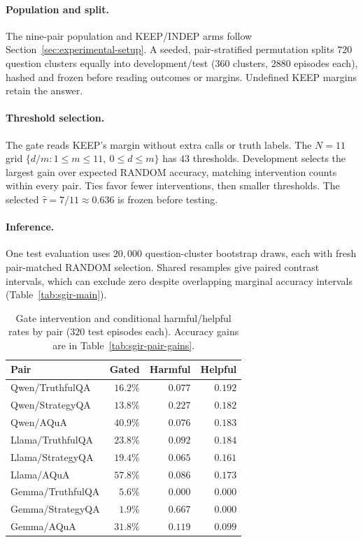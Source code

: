 \documentclass[11pt,a4paper]{article}
\theoremstyle{definition}
\begin{document}
\paragraph{Population and split.}
The nine-pair population and KEEP/INDEP arms follow Section~\ref{sec:experimental-setup}. A seeded, pair-stratified permutation splits $720$ question clusters equally into development/test ($360$ clusters, $2880$ episodes each), hashed and frozen before reading outcomes or margins. Undefined KEEP margins retain the answer.

\paragraph{Threshold selection.}
The gate reads KEEP's margin without extra calls or truth labels. The $N=11$ grid $\{d/m:1\le m\le11,\ 0\le d\le m\}$ has $43$ thresholds. Development selects the largest gain over expected RANDOM accuracy, matching intervention counts within every pair. Ties favor fewer interventions, then smaller thresholds. The selected $\hat\tau=7/11\approx0.636$ is frozen before testing.

\paragraph{Inference.}
One test evaluation uses $20{,}000$ question-cluster bootstrap draws, each with fresh pair-matched RANDOM selection. Shared resamples give paired contrast intervals, which can exclude zero despite overlapping marginal accuracy intervals (Table~\ref{tab:sgir-main}).

\begin{table}[H]
\centering\footnotesize
\setlength{\tabcolsep}{3pt}
\renewcommand{\arraystretch}{1.04}
\caption{Gate intervention and conditional harmful/helpful rates by pair ($320$ test episodes each). Accuracy gains are in Table~\ref{tab:sgir-pair-gains}.}
\label{tab:sgir-breakdown}
\begin{tabularx}{\columnwidth}{@{}Zrrr@{}}
\toprule
Pair & Gated & Harmful & Helpful\\
\midrule
Qwen/TruthfulQA & $16.2\%$ & $0.077$ & $0.192$\\
Qwen/StrategyQA & $13.8\%$ & $0.227$ & $0.182$\\
Qwen/AQuA & $40.9\%$ & $0.076$ & $0.183$\\
Llama/TruthfulQA & $23.8\%$ & $0.092$ & $0.184$\\
Llama/StrategyQA & $19.4\%$ & $0.065$ & $0.161$\\
Llama/AQuA & $57.8\%$ & $0.086$ & $0.173$\\
Gemma/TruthfulQA & $5.6\%$ & $0.000$ & $0.000$\\
Gemma/StrategyQA & $1.9\%$ & $0.667$ & $0.000$\\
Gemma/AQuA & $31.8\%$ & $0.119$ & $0.099$\\
\bottomrule
\end{tabularx}
\par\smallskip
\end{table}
\end{document}
